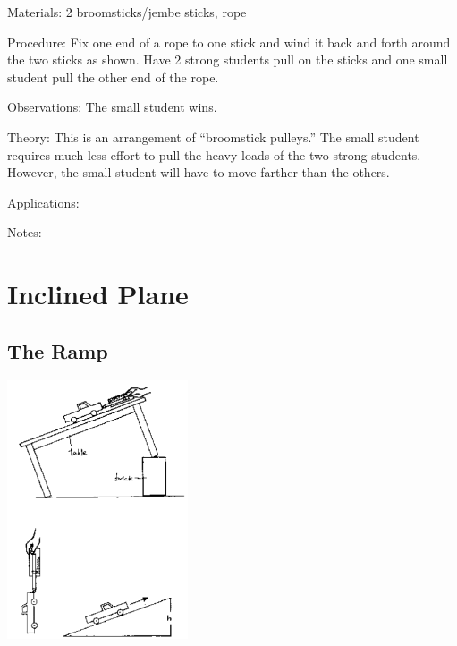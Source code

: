 \begin{multicols}{2}
\begin{description*}
\item[Materials:]{2 broomsticks/jembe sticks, rope}
\item[Procedure:]{Fix one end of a rope to one stick and wind it back and forth around the two sticks as shown. Have 2 strong students pull on the sticks and one small student pull the other end of the rope.}
\item[Observations:]{The small student wins.}
\item[Theory:]{This is an arrangement of ``broomstick pulleys.'' The small student requires much less effort to pull the heavy loads of the two strong students. However, the small student will have to move farther than the others.}
\item[Applications:]{}
\item[Notes:]{}
\end{description*}


\section*{Inclined Plane}


\subsection{The Ramp}

\begin{center}
\includegraphics[width=0.4\textwidth]{./img/source/inclined-plane.png}
\end{center}


\end{multicols}

